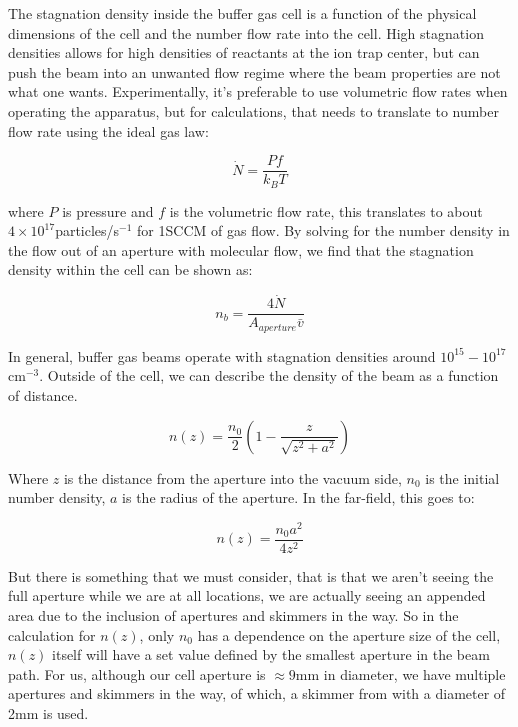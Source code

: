 The stagnation density inside the buffer gas cell is a function of the physical dimensions of the cell and the number flow rate into the cell. High stagnation densities allows for high densities of reactants at the ion trap center, but can push the beam into an unwanted flow regime where the beam properties are not what one wants. Experimentally, it's preferable to use volumetric flow rates when operating the apparatus, but for calculations, that needs to translate to number flow rate using the ideal gas law:

\begin{equation*}
	\dot{N} = \frac{P f}{k_B T}
\end{equation*}

where $P$ is pressure and $f$ is the volumetric flow rate, this translates to about $4\times10^{17}$particles/s$^{-1}$ for 1SCCM of gas flow. By solving for the number density in the flow out of an aperture with molecular flow, we find that the stagnation density within the cell can be shown as:

\begin{equation*}
	n_{b}=\frac{4 \dot{N}}{A_{aperture} \bar{v}}
\end{equation*}

In general, buffer gas beams operate with stagnation densities around $10^{15}-10^{17}$cm$^{-3}$. Outside of the cell, we can describe the density of the beam as a function of distance. \cite{Pauly}

\begin{equation}
	n(z)=\frac{n_0}{2}\left(1-\frac{z}{\sqrt{z^2+a^2}}\right)
\end{equation}

Where $z$ is the distance from the aperture into the vacuum side, $n_0$ is the initial number density, $a$ is the radius of the aperture. In the far-field, this goes to:

\begin{equation*}
	n(z)=\frac{n_0 a^2}{4 z^2}
\end{equation*}

But there is something that we must consider, that is that we aren't seeing the full aperture while we are at all locations, we are actually seeing an appended area due to the inclusion of apertures and skimmers in the way. So in the calculation for $n(z)$, only $n_0$ has a dependence on the aperture size of the cell, $n(z)$ itself will have a set value defined by the smallest aperture in the beam path. For us, although our cell aperture is $\approx 9$mm in diameter, we have multiple apertures and skimmers in the way, of which, a skimmer from  with a diameter of 2mm is used.

